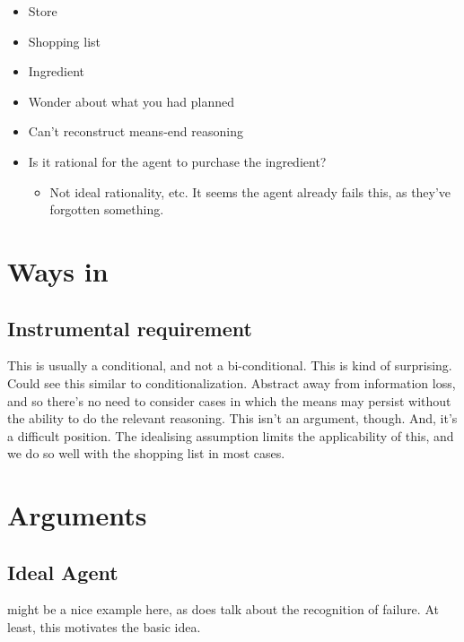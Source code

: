 \documentclass[10pt]{article}
\begin{document}
\begin{itemize}
\item Store
\item Shopping list
\item Ingredient
\item Wonder about what you had planned
\item Can't reconstruct means-end reasoning
\item Is it rational for the agent to purchase the ingredient?
  \begin{itemize}
  \item Not ideal rationality, etc.
    It seems the agent already fails this, as they've forgotten something.
  \end{itemize}
\end{itemize}

\section{Ways in}
\label{sec:ways}

\subsection{Instrumental requirement}
\label{sec:instr-requ}

This is usually a conditional, and not a bi-conditional.
This is kind of surprising.
Could see this similar to conditionalization.
Abstract away from information loss, and so there's no need to consider cases in which the means may persist without the ability to do the relevant reasoning.
This isn't an argument, though.
And, it's a difficult position.
The idealising assumption limits the applicability of this, and we do so well with the shopping list in most cases.

\section{Arguments}
\label{sec:arguments}

\subsection{Ideal Agent}
\label{sec:ideal-agent}

\begin{note}
  \citeauthor{Hume:2011aa} might be a nice example here, as \citeauthor{Hume:2011aa} does talk about the recognition of failure.
  At least, this motivates the basic idea.
\end{note}
\end{document}
